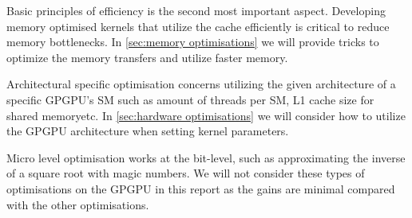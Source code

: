 Basic principles of efficiency is the second most important aspect.
Developing memory optimised kernels that utilize the cache efficiently is critical to reduce memory bottlenecks.
In \cref{sec:memory optimisations} we will provide tricks to optimize the memory transfers and utilize faster memory.

Architectural specific optimisation concerns utilizing the given architecture of a specific GPGPU's SM such as amount of threads per SM, L1 cache size for shared memoryetc.
In \cref{sec:hardware optimisations} we will consider how to utilize the GPGPU architecture when setting kernel parameters.

Micro level optimisation works at the bit-level, such as approximating the inverse of a square root with magic numbers.
We will not consider these types of optimisations on the GPGPU in this report as the gains are minimal compared with the other optimisations.~\cite{udacity}
